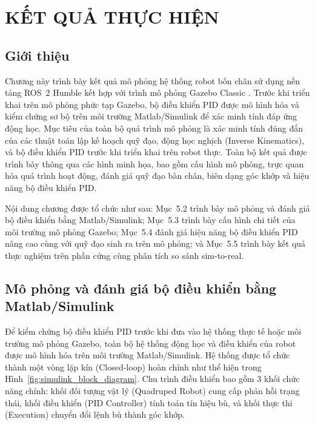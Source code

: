 \chapter{KẾT QUẢ THỰC HIỆN}


%

\section{Giới thiệu}
Chương này trình bày kết quả mô phỏng hệ thống robot bốn chân sử dụng nền tảng ROS~2 Humble \cite{ros2docs} kết hợp với trình mô phỏng Gazebo Classic \cite{gazebo}. Trước khi triển khai trên mô phỏng phức tạp Gazebo, bộ điều khiển PID được mô hình hóa và kiểm chứng sơ bộ trên môi trường Matlab/Simulink để xác minh tính đáp ứng động học. Mục tiêu của toàn bộ quá trình mô phỏng là xác minh tính đúng đắn của các thuật toán lập kế hoạch quỹ đạo, động học nghịch (Inverse Kinematics), và bộ điều khiển PID trước khi triển khai trên robot thực. Toàn bộ kết quả được trình bày thông qua các hình minh họa, bao gồm cấu hình mô phỏng, trực quan hóa quá trình hoạt động, đánh giá quỹ đạo bàn chân, biên dạng góc khớp và hiệu năng bộ điều khiển PID.

Nội dung chương được tổ chức như sau: Mục~5.2 trình bày mô phỏng và đánh giá bộ điều khiển bằng Matlab/Simulink; Mục~5.3 trình bày cấu hình chi tiết của môi trường mô phỏng Gazebo; Mục~5.4 đánh giá hiệu năng bộ điều khiển PID nâng cao cùng với quỹ đạo sinh ra trên mô phỏng; và Mục~5.5 trình bày kết quả thực nghiệm trên phần cứng cùng phân tích so sánh sim-to-real.

\section{Mô phỏng và đánh giá bộ điều khiển bằng Matlab/Simulink}

Để kiểm chứng bộ điều khiển PID trước khi đưa vào hệ thống thực tế hoặc môi trường mô phỏng Gazebo, toàn bộ hệ thống động học và điều khiển của robot được mô hình hóa trên môi trường Matlab/Simulink. Hệ thống được tổ chức thành một vòng lặp kín (Closed-loop) hoàn chỉnh như thể hiện trong Hình~\ref{fig:simulink_block_diagram}. Chu trình điều khiển bao gồm 3 khối chức năng chính: khối đối tượng vật lý (Quadruped Robot) cung cấp phản hồi trạng thái, khối điều khiển (PID Controller) tính toán tín hiệu bù, và khối thực thi (Execution) chuyển đổi lệnh bù thành góc khớp.


